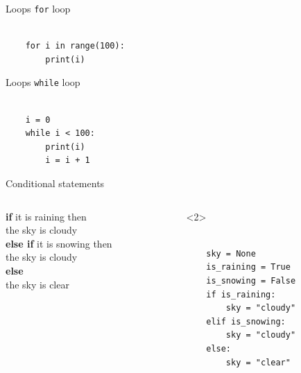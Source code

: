 \documentclass{beamer}
\begin{document}
\begin{frame}[fragile]{Loops}
\texttt{for} loop
\begin{verbatim}

    for i in range(100):
        print(i)
\end{verbatim}
\end{frame}

\begin{frame}[fragile]{Loops}
\texttt{while} loop
\begin{verbatim}

    i = 0
    while i < 100:
        print(i)
        i = i + 1
\end{verbatim}
\end{frame}

\begin{frame}[fragile]{Conditional statements}
    \begin{columns}
        \begin{column}{0.5\textwidth}
            \textbf{if} it is raining then \\ 
            the sky is cloudy \\
            \textbf{else if} it is snowing then \\
            the sky is cloudy \\
            \textbf{else} \\
            the sky is clear
        \end{column}
        \begin{column}{0.5\textwidth}
\begin{block}<2>{}
\footnotesize
\begin{verbatim}

    sky = None
    is_raining = True
    is_snowing = False
    if is_raining:
        sky = "cloudy"
    elif is_snowing:
        sky = "cloudy"
    else:
        sky = "clear"
\end{verbatim}
\end{block}
        \end{column}
    \end{columns}
\end{frame}
\end{document}
